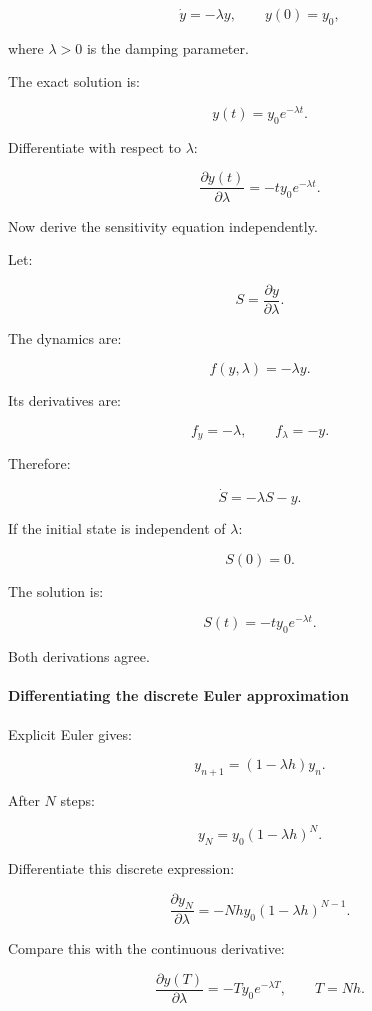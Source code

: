 \[
\dot y=-\lambda y, \qquad y(0)=y_0,
\]

where \(\lambda>0\) is the damping parameter.

The exact solution is:

\[
y(t)=y_0e^{-\lambda t}.
\]

Differentiate with respect to \(\lambda\):

\[
\boxed{ \frac{\partial y(t)}{\partial\lambda} = -ty_0e^{-\lambda t} }.
\]

Now derive the sensitivity equation independently.

Let:

\[
S=\frac{\partial y}{\partial\lambda}.
\]

The dynamics are:

\[
f(y,\lambda)=-\lambda y.
\]

Its derivatives are:

\[
f_y=-\lambda, \qquad f_\lambda=-y.
\]

Therefore:

\[
\boxed{ \dot S=-\lambda S-y }.
\]

If the initial state is independent of \(\lambda\):

\[
S(0)=0.
\]

The solution is:

\[
S(t)=-ty_0e^{-\lambda t}.
\]

Both derivations agree.

\paragraph{Differentiating the discrete Euler approximation}\label{02-foundations-ii-ch022-differentiating-the-discrete-euler-approximation}

\hypertarget{02-foundations-ii-ch022-differentiating-the-discrete-euler-approximation}{}

Explicit Euler gives:

\[
y_{n+1}=(1-\lambda h)y_n.
\]

After \(N\) steps:

\[
y_N=y_0(1-\lambda h)^N.
\]

Differentiate this discrete expression:

\[
\boxed{ \frac{\partial y_N}{\partial\lambda} = -Nhy_0(1-\lambda h)^{N-1} }.
\]

Compare this with the continuous derivative:

\[
\frac{\partial y(T)}{\partial\lambda} = -Ty_0e^{-\lambda T}, \qquad T=Nh.
\]

